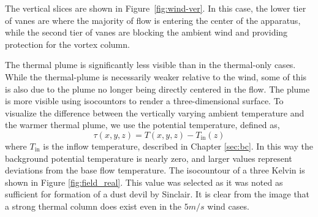 

The vertical slices are shown in Figure~\ref{fig:wind-ver}. In this
case, the lower tier of vanes are where the majority of flow is 
entering the center of the apparatus, while the second tier of vanes are
blocking the ambient wind and providing protection for the vortex column. 

The thermal plume is significantly less
visible than in the thermal-only cases. While the
thermal-plume is necessarily weaker relative to the wind, some of this
is also due to the plume no longer being directly centered in the
flow. The plume is more visible using isocountors to render a
three-dimensional surface. 
To visualize the difference between the vertically varying ambient
temperature and the warmer thermal plume, we use the potential
temperature, defined as, 
\begin{equation}
  \tau(x,y,z) = T(x,y,z) -T_{\text{in}}(z) 
   \label{eqn:tau}
\end{equation}
where $T_{\text{in}}$ is the inflow temperature, described
in Chapter \ref{sec:bc}. In this way the background potential
temperature is nearly zero, and larger values represent deviations from
the base flow temperature. The isocountour of a three Kelvin is 
shown in Figure \ref{fig:field_real}. This value was selected as
it was noted as sufficient for formation of a dust devil by
Sinclair\cite{Sinclair1969}. It is clear from the image that a 
strong thermal column does exist even in the $5 m/s$ wind cases. 

